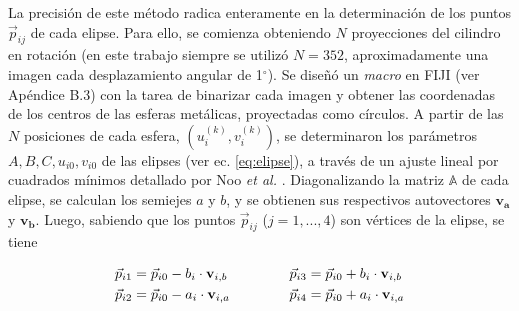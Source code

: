 La precisión de este método radica enteramente en la determinación de los puntos $\vec{p}_{ij}$
de cada elipse. Para ello, se comienza obteniendo $N$ proyecciones del cilindro en rotación
(en este trabajo siempre se utilizó $N=352$, aproximadamente una imagen cada desplazamiento
angular de 1$^{\circ}$). Se diseñó un \textit{macro} en FIJI (ver Apéndice B.3) con la tarea de binarizar cada imagen y obtener
las coordenadas de los centros de las esferas metálicas, proyectadas como círculos. A partir
de las $N$ posiciones de cada esfera, $(u_i^{(k)}, v_i^{(k)})$, se determinaron los parámetros
{$A, B, C, u_{i0}, v_{i0}$} de las elipses (ver ec. \ref{eq:elipse}), a través de un ajuste
lineal por cuadrados mínimos detallado por Noo \textit{et al.} \cite{Noo2000}. Diagonalizando la matriz
$\mathbb{A}$ de cada elipse, se calculan los semiejes $a$ y $b$, y se obtienen sus respectivos
autovectores $\mathbf{v_a}$ y $\mathbf{v_b}$. Luego, sabiendo que los puntos $\vec{p}_{ij}$
($j=1,...,4$) son vértices de la elipse, se tiene

\begin{equation}
    \begin{aligned}
        \vec{p}_{i1} &= \vec{p}_{i0} - b_i\cdot \mathbf{v}_{i,b}\\
        \vec{p}_{i2} &= \vec{p}_{i0} - a_i\cdot \mathbf{v}_{i,a}
    \end{aligned}
    \hspace{15mm}
    \begin{aligned}
        \vec{p}_{i3} &= \vec{p}_{i0} + b_i\cdot \mathbf{v}_{i,b}\\
        \vec{p}_{i4} &= \vec{p}_{i0} + a_i\cdot \mathbf{v}_{i,a}
    \end{aligned}
    \label{eq:vertices}
\end{equation}

